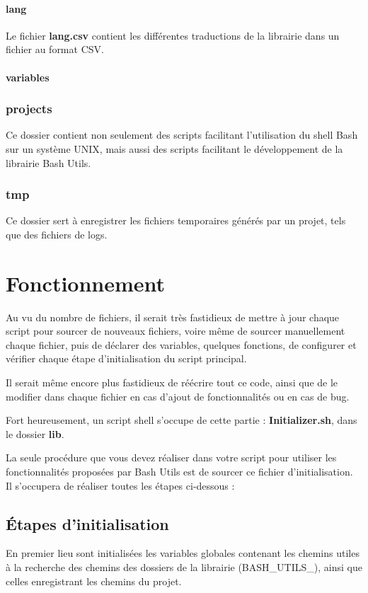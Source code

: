 \documentclass[a4paper,10pt]{article}
\begin{document}
\paragraph{lang}
Le fichier \textbf{lang.csv} contient les différentes traductions de la librairie dans un fichier au format CSV.

\paragraph{variables}

\subsubsection{projects}
Ce dossier contient non seulement des scripts facilitant l'utilisation du shell Bash sur un système UNIX, mais aussi des scripts facilitant le développement de la librairie Bash Utils.

\subsubsection{tmp}
Ce dossier sert à enregistrer les fichiers temporaires générés par un projet, tels que des fichiers de logs.


\section{Fonctionnement}
Au vu du nombre de fichiers, il serait très fastidieux de mettre à jour chaque script pour sourcer de nouveaux fichiers, voire même de sourcer manuellement chaque fichier, puis de déclarer des variables, quelques fonctions, de configurer et vérifier chaque étape d'initialisation du script principal.

Il serait même encore plus fastidieux de réécrire tout ce code, ainsi que de le modifier dans chaque fichier en cas d'ajout de fonctionnalités ou en cas de bug.

Fort heureusement, un script shell s'occupe de cette partie : \textbf{Initializer.sh}, dans le dossier \textbf{lib}.

La seule procédure que vous devez réaliser dans votre script pour utiliser les fonctionnalités proposées par Bash Utils est de sourcer ce fichier d'initialisation. Il s'occupera de réaliser toutes les étapes ci-dessous :

\subsection{Étapes d'initialisation}
En premier lieu sont initialisées les variables globales contenant les chemins utiles à la recherche des chemins des dossiers de la librairie (BASH_UTILS_), ainsi que celles enregistrant les chemins du projet.
\end{document}
